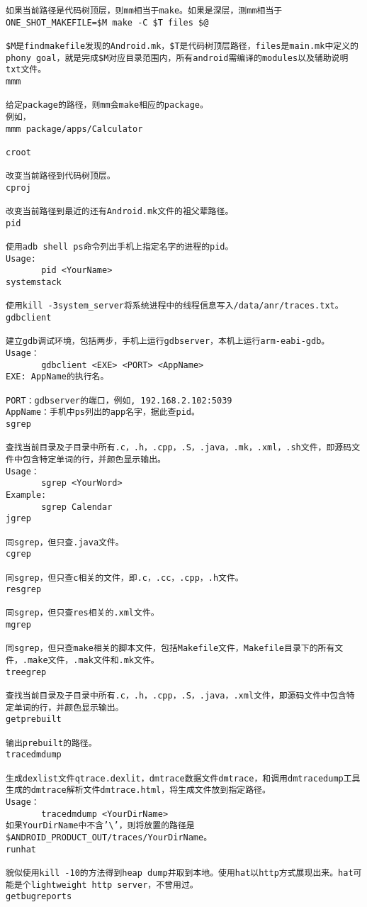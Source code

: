 \documentclass[12pt,a4paper]{article}
\begin{document}
\begin{verbatim}
如果当前路径是代码树顶层，则mm相当于make。如果是深层，测mm相当于
ONE_SHOT_MAKEFILE=$M make -C $T files $@
 
$M是findmakefile发现的Android.mk，$T是代码树顶层路径，files是main.mk中定义的phony goal，就是完成$M对应目录范围内，所有android需编译的modules以及辅助说明txt文件。
mmm
 
给定package的路径，则mm会make相应的package。
例如，
mmm package/apps/Calculator
 
croot
 
改变当前路径到代码树顶层。
cproj
 
改变当前路径到最近的还有Android.mk文件的祖父辈路径。
pid
 
使用adb shell ps命令列出手机上指定名字的进程的pid。
Usage:
       pid <YourName>
systemstack
 
使用kill -3system_server将系统进程中的线程信息写入/data/anr/traces.txt。
gdbclient
 
建立gdb调试环境，包括两步，手机上运行gdbserver，本机上运行arm-eabi-gdb。
Usage：
       gdbclient <EXE> <PORT> <AppName>
EXE: AppName的执行名。
 
PORT：gdbserver的端口，例如, 192.168.2.102:5039
AppName：手机中ps列出的app名字，据此查pid。
sgrep
 
查找当前目录及子目录中所有.c，.h，.cpp，.S，.java，.mk，.xml，.sh文件，即源码文件中包含特定单词的行，并颜色显示输出。
Usage：
       sgrep <YourWord>
Example:
       sgrep Calendar
jgrep
 
同sgrep，但只查.java文件。
cgrep
 
同sgrep，但只查c相关的文件，即.c，.cc，.cpp，.h文件。
resgrep
 
同sgrep，但只查res相关的.xml文件。
mgrep
 
同sgrep，但只查make相关的脚本文件，包括Makefile文件，Makefile目录下的所有文件，.make文件，.mak文件和.mk文件。
treegrep
 
查找当前目录及子目录中所有.c，.h，.cpp，.S，.java，.xml文件，即源码文件中包含特定单词的行，并颜色显示输出。
getprebuilt
 
输出prebuilt的路径。
tracedmdump
 
生成dexlist文件qtrace.dexlit，dmtrace数据文件dmtrace，和调用dmtracedump工具生成的dmtrace解析文件dmtrace.html，将生成文件放到指定路径。
Usage：
       tracedmdump <YourDirName>
如果YourDirName中不含’\’，则将放置的路径是$ANDROID_PRODUCT_OUT/traces/YourDirName。
runhat
 
貌似使用kill -10的方法得到heap dump并取到本地。使用hat以http方式展现出来。hat可能是个lightweight http server，不曾用过。
getbugreports
 

\end{verbatim}
\end{document}
